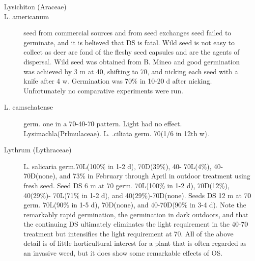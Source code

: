 \begin{description}
\item[Lysichiton (Araceae)]
\item[L. americanum] seed from commercial sources and from seed exchanges seed
failed to germinate, and it is believed that DS is fatal. Wild seed is not easy to collect
as deer are fond of the fleshy seed capsules and are the agents of dispersal. Wild
seed was obtained from B. Mineo and good germination was achieved by 3 m at 40,
shifting to 70, and nicking each seed with a knife after 4 w. Germination was 70\% in
10-20 d after nicking. Unfortunately no comparative experiments were run.
\item[L. camschatense] germ. one in a 70-40-70 pattern. Light had no effect.
Lysimachla(Prlmulaceae). L. .ciliata germ. 70(1/6 in 12th w).

\item[Lythrum (Lythraceae)] L. salicaria germ.70L(100\% in 1-2 d), 70D(39\%), 40-
70L(4\%), 40-70D(none), and 73\% in February through April in outdoor treatment using
fresh seed. Seed DS 6 m at 70 germ. 70L(100\% in 1-2 d), 70D(12\%), 40(29\%)-
70L(71\% in 1-2 d), and 40(29\%)-70D(none). Seeds DS 12 m at 70 germ. 70L(90\% in
1-5 d), 70D(none), and 40-70D(90\% in 3-4 d). Note the remarkably rapid germination,
the germination in dark outdoors, and that the continuing DS ultimately eliminates the
light requirement in the 40-70 treatment but intensifies the light requirement at 70. All
of the above detail is of little horticultural interest for a plant that is often regarded as an
invasive weed, but it does show some remarkable effects of OS.

\end{description}
